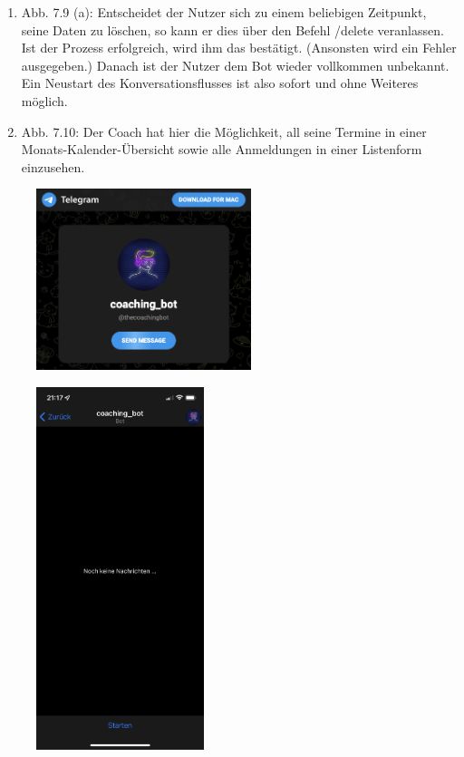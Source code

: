 \begin{enumerate}
		\item Abb. 7.9 (a): Entscheidet der Nutzer sich zu einem beliebigen Zeitpunkt, seine Daten zu löschen, so kann er dies über den Befehl /delete veranlassen. Ist der Prozess erfolgreich, wird ihm das bestätigt. (Ansonsten wird ein Fehler ausgegeben.) Danach ist der Nutzer dem Bot wieder vollkommen unbekannt. Ein Neustart des Konversationsflusses ist also sofort und ohne Weiteres möglich.
		\item Abb. 7.10: Der Coach hat hier die Möglichkeit, all seine Termine in einer Monats-Kalender-Übersicht sowie alle Anmeldungen in einer Listenform einzusehen. 
		
	\end{enumerate}
	

	\begin{figure}
		\centering
		\begin{minipage}{.48\linewidth}
		  \centering
			{\includegraphics[width=\linewidth,height=150pt,keepaspectratio]{images/Screenshots/link.png}}
	  
			{\includegraphics[width=\linewidth,height=300pt,keepaspectratio]{images/Screenshots/start.PNG}}
	  

\end{minipage}
\end{figure}
